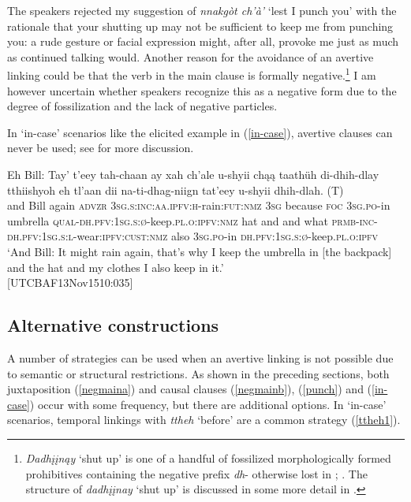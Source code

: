 \documentclass[output=paper,colorlinks,citecolor=brown]{langscibook}
\begin{document}
The speakers rejected my suggestion of \textit{nnakgòt ch'à'} `lest I punch you' with the rationale that your shutting up may not be sufficient to keep me from punching you: a rude gesture or facial expression might, after all, provoke me just as much as continued talking would. Another reason for the avoidance of an avertive linking could be that the verb in the main clause is formally negative.\footnote{\textit{Dadhįįnąy} `shut up' is one of a handful of fossilized morphologically formed prohibitives containing the negative prefix \textit{dh}- otherwise lost in  \citep{KariJ1993, vanGelderenE2008dene}; \citet[472]{LovickO2020}. The structure of \textit{dadhįįnay} `shut up' is discussed in some more detail in  \citet{LovickO2020ijal}. } I am however uncertain whether speakers recognize this as a negative form due to the degree of fossilization and the lack of negative particles.

In `in-case' scenarios like the elicited example in (\ref{in-case}), avertive clauses can never be used; see  for more discussion.

\ea \label{in-case}
\gll  Eh Bill: Tay' t'eey tah-chaan ay xah ch'ale  u-shyii {chąą taathüh} di-dhih-dlay tthiishyoh eh tl'aan dii na-ti-dhag-niign tat'eey u-shyii {dhih-dlah. \textnormal{(T)}} \\
and Bill again \textsc{advzr} \textsc{3sg.s:inc:aa.ipfv:h}-rain:\textsc{fut:nmz} \textsc{3sg} because \textsc{foc} \textsc{3sg.po}-in umbrella \textsc{qual-dh.pfv:1sg.s:ø}-keep.\textsc{pl.o:ipfv:nmz} hat and and what \textsc{prmb-inc-dh.pfv:1sg.s:l}-wear:\textsc{ipfv:cust:nmz} also \textsc{3sg.po}-in \textsc{dh.pfv:1sg.s:ø}-keep.\textsc{pl.o:ipfv} \\
\glt `And Bill: It might rain again, that's why I keep the umbrella in [the backpack] and the hat and my clothes I also keep in it.' \\ \hfill [UTCBAF13Nov1510:035]
\z


\subsection{Alternative constructions}
\label{subsection:alternative-constru}

A number of strategies can be used when an avertive linking is not possible due to semantic or structural restrictions. As shown in the preceding sections, both juxtaposition (\ref{negmaina}) and causal clauses (\ref{negmainb}), (\ref{punch}) and (\ref{in-case}) occur with some frequency, but there are additional options. In `in-case' scenarios, temporal linkings with \textit{ttheh} `before' are a common strategy (\ref{ttheh1}). 
\end{document}
